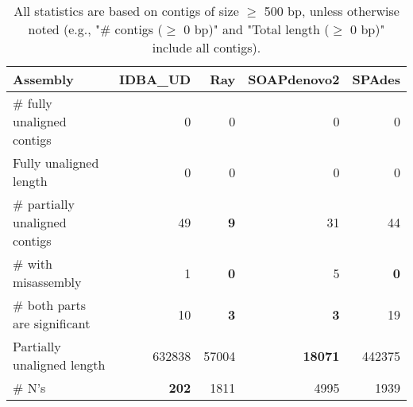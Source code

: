 \documentclass[12pt,a4paper]{article}
\begin{document}
\begin{table}[ht]
\begin{center}
\caption{All statistics are based on contigs of size $\geq$ 500 bp, unless otherwise noted (e.g., "\# contigs ($\geq$ 0 bp)" and "Total length ($\geq$ 0 bp)" include all contigs).}
\begin{tabular}{|l*{4}{|r}|}
\hline
Assembly & IDBA\_UD & Ray & SOAPdenovo2 & SPAdes \\ \hline
\# fully unaligned contigs & 0 & 0 & 0 & 0 \\ \hline
Fully unaligned length & 0 & 0 & 0 & 0 \\ \hline
\# partially unaligned contigs & 49 & {\bf 9} & 31 & 44 \\ \hline
\hspace{5mm}\# with misassembly & 1 & {\bf 0} & 5 & {\bf 0} \\ \hline
\hspace{5mm}\# both parts are significant & 10 & {\bf 3} & {\bf 3} & 19 \\ \hline
Partially unaligned length & 632838 & 57004 & {\bf 18071} & 442375 \\ \hline
\# N's & {\bf 202} & 1811 & 4995 & 1939 \\ \hline
\end{tabular}
\end{center}
\end{table}
\end{document}
